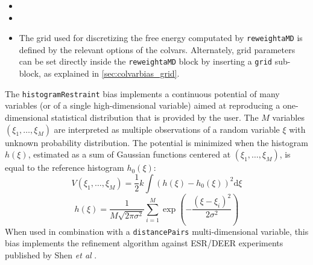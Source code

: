 {\begin{itemize}
\item %

\item %

\item %

The grid used for discretizing the free energy computated by \texttt{reweightaMD} is defined by the relevant options of the colvars.
Alternately, grid parameters can be set directly inside the \texttt{reweightaMD} block by inserting a \texttt{grid} sub-block, as explained in \ref{sec:colvarbias_grid}.


\end{itemize}
}



The \texttt{histogramRestraint} bias implements a continuous potential of many variables (or of a single high-dimensional variable) aimed at reproducing a one-dimensional statistical distribution that is provided by the user.
The $M$ variables $(\xi_{1}, \ldots, \xi_{M})$ are interpreted as multiple observations of a random variable $\xi$ with unknown probability distribution.
The potential is minimized when the histogram $h(\xi)$, estimated as a sum of Gaussian functions centered at $(\xi_{1}, \ldots, \xi_{M})$, is equal to the reference histogram $h_{0}(\xi)$:
\begin{equation}
  \label{eq:colvarbias_restraint_histogram}
  V\left(\xi_{1}, \ldots, \xi_{M}\right) = \frac{1}{2} k \int\left(h(\xi)-h_{0}(\xi)\right)^2 \mathrm{d}\xi
\end{equation}
\begin{equation}
  \label{eq:colvarbias_restraint_histogram_gaussian}
  h\left(\xi\right) = \frac{1}{M\sqrt{2\pi\sigma^2}} \sum_{i=1}^{M} \exp\left(-\frac{(\xi-\xi_{i})^2}{2\sigma^2}\right)
\end{equation}
When used in combination with a \texttt{distancePairs} multi-dimensional variable, this bias implements the refinement algorithm against ESR/DEER experiments published by Shen \emph{et al} \cite{Shen2015}.

